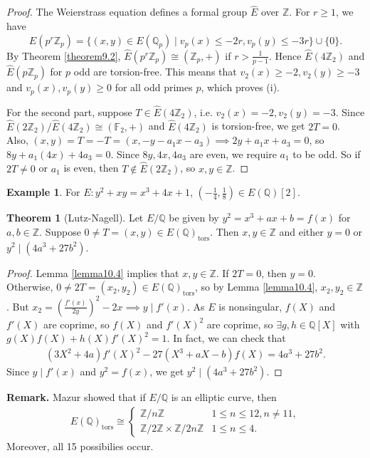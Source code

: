 \documentclass{article}
\theoremstyle{definition}
\newtheorem{theorem}{Theorem}[section]
\newtheorem{example}{Example}[section]
\begin{document}
\begin{proof}
    The Weierstrass equation defines a formal group $\widehat{E}$ over $\mathbb{Z}$. For $r \ge 1$, we have 
    \[
    \widehat{E}(p^r \mathbb{Z}_p) = \{(x,y) \in E(\mathbb{Q}_p) \mid v_p(x)\le -2r, v_p(y)\le -3r\} \cup \{0\}.
    \]
    By Theorem \ref{theorem9.2}, $\widehat{E}(p^r\mathbb{Z}_p) \cong (\mathbb{Z}_p,+)$ if $r>\frac{1}{p-1}$. Hence $\widehat{E}(4\mathbb{Z}_2)$ and $\widehat{E}(p\mathbb{Z}_p)$ for $p$ odd are torsion-free. This means that $v_2(x)\ge -2, v_2(y)\ge -3$ and $v_p(x),v_p(y)\ge 0$ for all odd primes $p$, which proves (i).
    \vspace{1mm}
     
    For the second part, suppose $T \in \widehat{E}(4\mathbb{Z}_2)$, i.e. $v_2(x)=-2,v_2(y)=-3$. Since $\widehat{E}(2\mathbb{Z}_2)/\widehat{E}(4\mathbb{Z}_2)\cong (\mathbb{F}_2,+)$ and $\widehat{E}(4\mathbb{Z}_2)$ is torsion-free, we get $2T=0$. Also, $(x,y) = T = -T = (x,-y-a_1x-a_3) \implies 2y+a_1x+a_3=0$, so $8y+a_1(4x)+4a_3=0$. Since $8y, 4x, 4a_3$ are even, we require $a_1$ to be odd. So if $2T \neq 0$ or $a_1$ is even, then $T \not\in \widehat{E}(2\mathbb{Z}_2)$, so $x, y \in \mathbb{Z}$.
\end{proof}
\begin{example}
    For $E:y^2+xy=x^3+4x+1$, $\left(-\frac{1}{4},\frac{1}{8}\right) \in E(\mathbb{Q})[2]$.
\end{example}
\begin{theorem}[Lutz-Nagell]
    Let $E/\mathbb{Q}$ be given by $y^2=x^3+ax+b=f(x)$ for $a,b \in \mathbb{Z}$. Suppose $0 \neq T = (x,y) \in E(\mathbb{Q})_{\text{tors}}$. Then $x,y \in \mathbb{Z}$ and either $y=0$ or $y^2 \mid (4a^3+27b^2)$.
\end{theorem}
\begin{proof}
    Lemma \ref{lemma10.4} implies that $x,y \in \mathbb{Z}$. If $2T=0$, then $y=0$. Otherwise, $0 \neq 2T = (x_2,y_2) \in E(\mathbb{Q})_{\text{tors}}$, so by Lemma \ref{lemma10.4}, $x_2,y_2 \in \mathbb{Z}$. But $x_2 = \left(\frac{f'(x)}{2y}\right)^2-2x \implies y \mid f'(x)$. As $E$ is nonsingular, $f(X)$ and $f'(X)$ are coprime, so $f(X)$ and $f'(X)^2$ are coprime, so $\exists g,h \in \mathbb{Q}[X]$ with $g(X)f(X)+h(X)f'(X)^2=1$. In fact, we can check that
    \begin{align*}
        (3X^2+4a)f'(X)^2-27(X^3+aX-b)f(X)=4a^3+27b^2.
    \end{align*}
    Since $y \mid f'(x)$ and $y^2 = f(x)$, we get $y^2 \mid (4a^3+27b^2)$.
\end{proof}
\textbf{Remark.} Mazur showed that if $E/\mathbb{Q}$ is an elliptic curve, then
\begin{align*}
    E(\mathbb{Q})_{\text{tors}} \cong \begin{cases}
        \mathbb{Z}/n\mathbb{Z} & 1\le n\le 12, n \neq 11,\\
        \mathbb{Z}/2\mathbb{Z} \times \mathbb{Z}/2n\mathbb{Z} & 1\le n\le 4.
    \end{cases}
\end{align*}
Moreover, all 15 possibilies occur.
\end{document}
